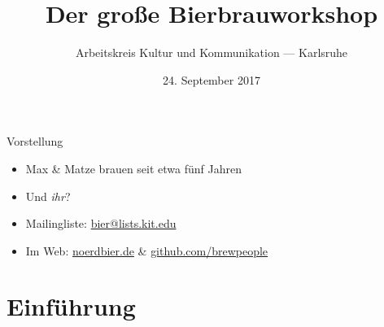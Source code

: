 \documentclass[9pt, ngerman]{beamer}
\title{Der große Bierbrauworkshop}
\author{Arbeitskreis Kultur und Kommunikation --- Karlsruhe}
\date{24. September 2017}
\begin{document}
\maketitle


\begin{frame}{Vorstellung}
  \begin{itemize}
    \item Max \& Matze brauen seit etwa fünf Jahren
    \item<2-> Und \emph{ihr}?
  \end{itemize}

  \begin{itemize}
    \item Mailingliste: \url{bier@lists.kit.edu}
    \item Im Web: \url{noerdbier.de} \& \url{github.com/brewpeople}
  \end{itemize}
\end{frame}

\section{Einführung}
\end{document}
